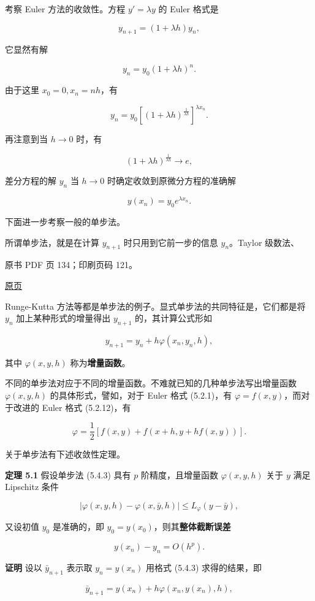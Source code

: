 考察 Euler 方法的收敛性。方程 \(y'=\lambda y\) 的 Euler 格式是

\[
y_{n+1}=(1+\lambda h)y_n,\tag{5.4.2}
\]

它显然有解

\[
y_n=y_0(1+\lambda h)^n.
\]

由于这里 \(x_0=0,x_n=nh\)，有

\[
y_n=y_0\left[(1+\lambda h)^{\frac{1}{\lambda h}}\right]^{\lambda x_n}.
\]

再注意到当 \(h\to0\) 时，有

\[
(1+\lambda h)^{\frac{1}{\lambda h}}\to e,
\]

差分方程的解 \(y_n\) 当 \(h\to0\) 时确定收敛到原微分方程的准确解

\[
y(x_n)=y_0e^{\lambda x_n}.
\]

下面进一步考察一般的单步法。

所谓单步法，就是在计算 \(y_{n+1}\) 时只用到它前一步的信息 \(y_n\)。Taylor 级数法、

\clearpage

原书 PDF 页 134；印刷页码 121。

\href{source-images/pdf-134.jpeg}{原页}

Runge-Kutta 方法等都是单步法的例子。显式单步法的共同特征是，它们都是将 \(y_n\) 加上某种形式的增量得出 \(y_{n+1}\) 的，其计算公式形如

\[
y_{n+1}=y_n+h\varphi(x_n,y_n,h),\tag{5.4.3}
\]

其中 \(\varphi(x,y,h)\) 称为\textbf{增量函数}。

不同的单步法对应于不同的增量函数。不难就已知的几种单步法写出增量函数 \(\varphi(x,y,h)\) 的具体形式，譬如，对于 Euler 格式 (5.2.1)，有 \(\varphi=f(x,y)\)，而对于改进的 Euler 格式 (5.2.12)，有

\[
\varphi=\frac12[f(x,y)+f(x+h,y+hf(x,y))].\tag{5.4.4}
\]

关于单步法有下述收敛性定理。

\textbf{定理 5.1} 假设单步法 (5.4.3) 具有 \(p\) 阶精度，且增量函数 \(\varphi(x,y,h)\) 关于 \(y\) 满足 Lipschitz 条件

\[
|\varphi(x,y,h)-\varphi(x,\bar y,h)|\leqslant L_\varphi(y-\bar y),\tag{5.4.5}
\]

又设初值 \(y_0\) 是准确的，即 \(y_0=y(x_0)\)，则其\textbf{整体截断误差}

\[
y(x_n)-y_n=O(h^p).\tag{5.4.6}
\]

\textbf{证明} 设以 \(\bar y_{n+1}\) 表示取 \(y_n=y(x_n)\) 用格式 (5.4.3) 求得的结果，即

\[
\bar y_{n+1}=y(x_n)+h\varphi(x_n,y(x_n),h),\tag{5.4.7}
\]


